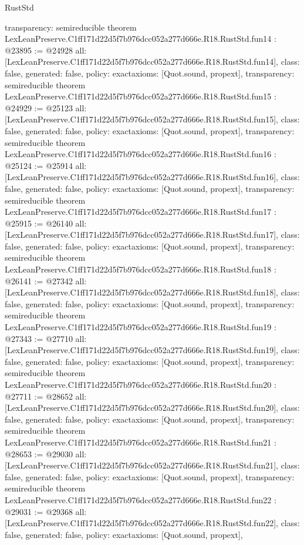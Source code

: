 \begin{lexlean}{RustStd}
\begin{coremodule}
{  transparency: semireducible
}
theorem LexLeanPreserve.C1ff171d22d5f7b976dcc052a277d666e.R18.RustStd.fun14 : @23895 := @24928 {
  all: [LexLeanPreserve.C1ff171d22d5f7b976dcc052a277d666e.R18.RustStd.fun14],
  class: false,
  generated: false,
  policy: exact{axioms: [Quot.sound, propext]},
  transparency: semireducible
}
theorem LexLeanPreserve.C1ff171d22d5f7b976dcc052a277d666e.R18.RustStd.fun15 : @24929 := @25123 {
  all: [LexLeanPreserve.C1ff171d22d5f7b976dcc052a277d666e.R18.RustStd.fun15],
  class: false,
  generated: false,
  policy: exact{axioms: [Quot.sound, propext]},
  transparency: semireducible
}
theorem LexLeanPreserve.C1ff171d22d5f7b976dcc052a277d666e.R18.RustStd.fun16 : @25124 := @25914 {
  all: [LexLeanPreserve.C1ff171d22d5f7b976dcc052a277d666e.R18.RustStd.fun16],
  class: false,
  generated: false,
  policy: exact{axioms: [Quot.sound, propext]},
  transparency: semireducible
}
theorem LexLeanPreserve.C1ff171d22d5f7b976dcc052a277d666e.R18.RustStd.fun17 : @25915 := @26140 {
  all: [LexLeanPreserve.C1ff171d22d5f7b976dcc052a277d666e.R18.RustStd.fun17],
  class: false,
  generated: false,
  policy: exact{axioms: [Quot.sound, propext]},
  transparency: semireducible
}
theorem LexLeanPreserve.C1ff171d22d5f7b976dcc052a277d666e.R18.RustStd.fun18 : @26141 := @27342 {
  all: [LexLeanPreserve.C1ff171d22d5f7b976dcc052a277d666e.R18.RustStd.fun18],
  class: false,
  generated: false,
  policy: exact{axioms: [Quot.sound, propext]},
  transparency: semireducible
}
theorem LexLeanPreserve.C1ff171d22d5f7b976dcc052a277d666e.R18.RustStd.fun19 : @27343 := @27710 {
  all: [LexLeanPreserve.C1ff171d22d5f7b976dcc052a277d666e.R18.RustStd.fun19],
  class: false,
  generated: false,
  policy: exact{axioms: [Quot.sound, propext]},
  transparency: semireducible
}
theorem LexLeanPreserve.C1ff171d22d5f7b976dcc052a277d666e.R18.RustStd.fun20 : @27711 := @28652 {
  all: [LexLeanPreserve.C1ff171d22d5f7b976dcc052a277d666e.R18.RustStd.fun20],
  class: false,
  generated: false,
  policy: exact{axioms: [Quot.sound, propext]},
  transparency: semireducible
}
theorem LexLeanPreserve.C1ff171d22d5f7b976dcc052a277d666e.R18.RustStd.fun21 : @28653 := @29030 {
  all: [LexLeanPreserve.C1ff171d22d5f7b976dcc052a277d666e.R18.RustStd.fun21],
  class: false,
  generated: false,
  policy: exact{axioms: [Quot.sound, propext]},
  transparency: semireducible
}
theorem LexLeanPreserve.C1ff171d22d5f7b976dcc052a277d666e.R18.RustStd.fun22 : @29031 := @29368 {
  all: [LexLeanPreserve.C1ff171d22d5f7b976dcc052a277d666e.R18.RustStd.fun22],
  class: false,
  generated: false,
  policy: exact{axioms: [Quot.sound, propext]},
}
\end{coremodule}
\end{lexlean}
